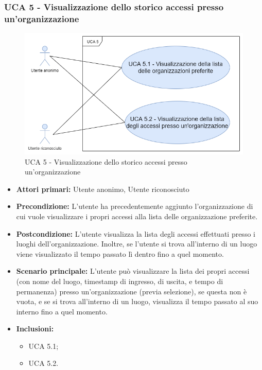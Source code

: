 \newpage

\subsubsection{UCA 5 - Visualizzazione dello storico accessi presso un'organizzazione}
\begin{figure}[h]
	\centering	
	\includegraphics[scale=0.5]{sezioni/UseCase/Immagini/UCA5.png}
	\caption{UCA 5 - Visualizzazione dello storico accessi presso un'organizzazione}
\end{figure}

\begin{itemize}
    \item \textbf{Attori primari:} Utente anonimo, Utente riconosciuto
    \item \textbf{Precondizione:} L'utente ha precedentemente aggiunto l'organizzazione di cui vuole visualizzare i propri accessi alla lista delle organizzazione preferite.
    \item \textbf{Postcondizione:} L'utente visualizza la lista degli accessi effettuati presso i luoghi dell'organizzazione. Inoltre, se l'utente si trova all'interno di un luogo viene visualizzato il tempo passato lì dentro fino a quel momento.
    \item \textbf{Scenario principale:} L'utente può visualizzare la lista dei propri accessi (con nome del luogo, timestamp di ingresso, di uscita, e tempo di permanenza) presso un'organizzazione (previa selezione), se questa non è vuota, e se si trova all'interno di un luogo, visualizza il tempo passato al suo interno fino a quel momento.
    \item \textbf{Inclusioni:}
    \begin{itemize}
        \item UCA 5.1;
        \item UCA 5.2.
    \end{itemize}
\end{itemize}



